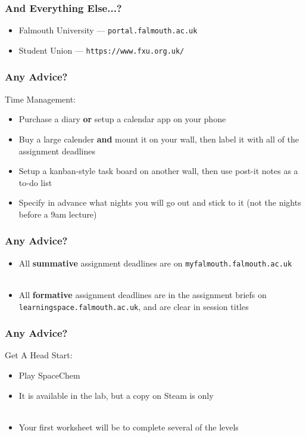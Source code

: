 \begin{frame}
	\frametitle{And Everything Else...?}	
	\begin{itemize}
		\item Falmouth University --- \texttt{portal.falmouth.ac.uk}
		\item Student Union --- \texttt{https://www.fxu.org.uk/}
	\end{itemize}
\end{frame}

\begin{frame}
	\frametitle{Any Advice?}	
	
	Time Management:
	
	\begin{itemize}
		\item Purchase a diary \textbf{or} setup a calendar app on your phone
		\item Buy a large calender \textbf{and} mount it on your wall, then label it with all of the assignment deadlines
		\item Setup a kanban-style task board on another wall, then use post-it notes as a to-do list
		\item Specify in advance what nights you will go out and stick to it (not the nights before a 9am lecture)
	\end{itemize}
\end{frame}

\begin{frame}
	\frametitle{Any Advice?}	
	
	\begin{itemize}
		\item All \textbf{summative} assignment deadlines are on \texttt{myfalmouth.falmouth.ac.uk}
		\\~\\
		\item All \textbf{formative} assignment deadlines are in the assignment briefs on \texttt{learningspace.falmouth.ac.uk}, and are clear in session titles
	\end{itemize}
\end{frame}


\begin{frame}
	\frametitle{Any Advice?}	
	
	Get A Head Start:
	
	\begin{itemize}
		\item Play SpaceChem
		\item It is available in the lab, but a copy on Steam is only 
		\\~\\
		\item Your first worksheet will be to complete several of the levels
	\end{itemize}
\end{frame}


